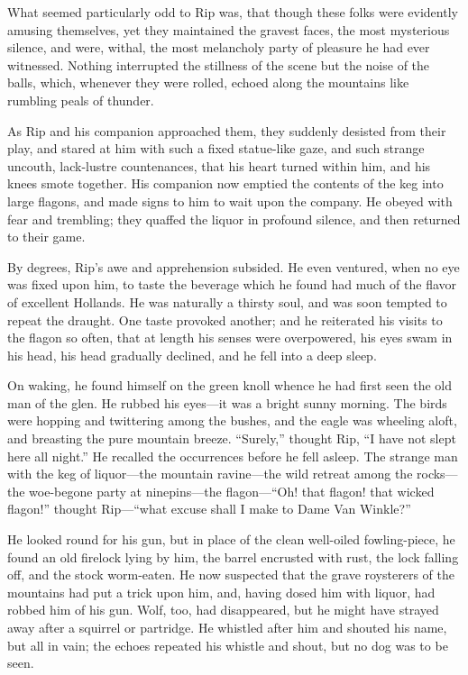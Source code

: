 What seemed particularly odd to Rip was, that though these folks were evidently amusing themselves, yet they maintained the gravest faces, the most mysterious silence, and were, withal, the most melancholy party of pleasure he had ever witnessed. Nothing interrupted the stillness of the scene but the noise of the balls, which, whenever they were rolled, echoed along the mountains like rumbling peals of thunder.

As Rip and his companion approached them, they suddenly desisted from their play, and stared at him with such a fixed statue-like gaze, and such strange uncouth, lack-lustre countenances, that his heart turned within him, and his knees smote together. His companion now emptied the contents of the keg into large flagons, and made signs to him to wait upon the company. He obeyed with fear and trembling; they quaffed the liquor in profound silence, and then returned to their game.

By degrees, Rip’s awe and apprehension subsided. He even ventured, when no eye was fixed upon him, to taste the beverage which he found had much of the flavor of excellent Hollands. He was naturally a thirsty soul, and was soon tempted to repeat the draught. One taste provoked another; and he reiterated his visits to the flagon so often, that at length his senses were overpowered, his eyes swam in his head, his head gradually declined, and he fell into a deep sleep.

On waking, he found himself on the green knoll whence he had first seen the old man of the glen. He rubbed his eyes—it was a bright sunny morning. The birds were hopping and twittering among the bushes, and the eagle was wheeling aloft, and breasting the pure mountain breeze. “Surely,” thought Rip, “I have not slept here all night.” He recalled the occurrences before he fell asleep. The strange man with the keg of liquor—the mountain ravine—the wild retreat among the rocks—the woe-begone party at ninepins—the flagon—“Oh! that flagon! that wicked flagon!” thought Rip—“what excuse shall I make to Dame Van Winkle?”

He looked round for his gun, but in place of the clean well-oiled fowling-piece, he found an old firelock lying by him, the barrel encrusted with rust, the lock falling off, and the stock worm-eaten. He now suspected that the grave roysterers of the mountains had put a trick upon him, and, having dosed him with liquor, had robbed him of his gun. Wolf, too, had disappeared, but he might have strayed away after a squirrel or partridge. He whistled after him and shouted his name, but all in vain; the echoes repeated his whistle and shout, but no dog was to be seen.

